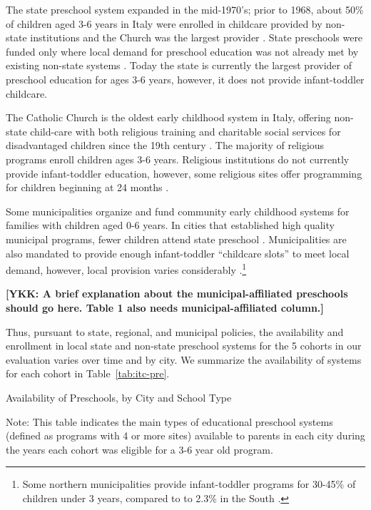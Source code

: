 The state preschool system expanded in the mid-1970's; prior to 1968, about 50\% of children aged 3-6 years in Italy were enrolled in childcare provided by non-state institutions and the Church was the largest provider \citep{Hohnerlein_2009_Paradox-Public-Preschools}. State preschools were funded only where local demand for preschool education was not already met by existing non-state systems \citep{Hohnerlein_2009_Paradox-Public-Preschools}. Today the state is currently the largest provider of preschool education for ages 3-6 years, however, it does not provide infant-toddler childcare. 

The Catholic Church is the oldest early childhood system in Italy, offering non-state child-care with both religious training and charitable social services for disadvantaged children since the 19th century \citep{OECD_2001_Italy-Country-Note}. The majority of religious programs enroll children ages 3-6 years. Religious institutions do not currently provide infant-toddler education, however, some religious sites offer programming for children beginning at 24 months \citep{Malizia-Cicatelli_2011_BOOK_Catholic-School}. 

Some municipalities organize and fund community early childhood systems for families with children aged 0-6 years. In cities that established high quality municipal programs, fewer children attend state preschool \citep{OECD_2001_Italy-Country-Note}. Municipalities are also mandated to provide enough infant-toddler ``childcare slots'' to meet local demand, however, local provision varies considerably \citep{Saraceno_1984_Soc-Probs}.\footnote{Some northern municipalities provide infant-toddler programs for 30-45\% of children under 3 years, compared to to 2.3\% in the South \citep{Becchi-Ferrari_1990_Pub-Inf-Centres-Italy,Musatti-Picchio_2010_IJEC}.}

\noindent\textbf{[YKK: A brief explanation about the municipal-affiliated preschools should go here. Table 1 also needs municipal-affiliated column.]}

Thus, pursuant to state, regional, and municipal policies, the availability and enrollment in local state and non-state preschool systems for the 5 cohorts in our evaluation varies over time and by city. We summarize the availability of systems for each cohort in Table~\ref{tab:itc-pre}. 

\begin{table}[H]
\centering
\caption{Availability of Preschools, by City and School Type}\label{tab:itc-pre}
\begin{adjustbox}{width=\textwidth}
\begin{threeparttable}
	
\begin{tablenotes}
Note: This table indicates the main types of educational preschool systems (defined as programs with 4 or more sites) available to parents in each city during the years each cohort was eligible for a 3-6 year old program. 
\end{tablenotes}
\end{threeparttable}
\end{adjustbox}
\end{table}

